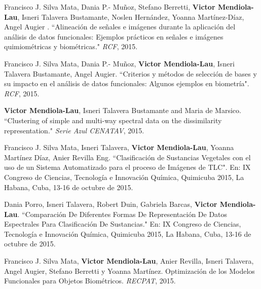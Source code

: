 \documentclass[]{friggeri-cv}
\begin{document}
\begin{paperlist}
  \paperentry
    {}
    {}
    {}
    {
		Francisco J. Silva Mata, Dania P.- Muñoz, Stefano Berretti, \textbf{Victor Mendiola-Lau}, Isneri Talavera Bustamante, Noslen Hernández, Yoanna Martínez-Díaz, Angel Augier . ``Alineación de señales e imágenes durante la aplicación del análisis de datos funcionales: Ejemplos prácticos en señales e imágenes quimiométricas y biométricas." \emph{RCF}, 2015.
    }
\end{paperlist}

\begin{paperlist}
  \paperentry
    {}
    {}
    {}
    {
		Francisco J. Silva Mata, Dania P.- Muñoz, \textbf{Victor Mendiola-Lau}, Isneri Talavera Bustamante, Angel Augier. ``Criterios y métodos de selección de bases y su impacto en el análisis de datos funcionales: Algunos ejemplos en biometría". \emph{RCF}, 2015.
    }
\end{paperlist}

\begin{paperlist}
  \paperentry
    {}
    {}
    {}
    {
		\textbf{Victor Mendiola-Lau}, Isneri Talavera Bustamante and Maria de Marsico. ``Clustering of simple and multi-way spectral data on the dissimilarity representation." \emph{Serie Azul CENATAV}, 2015.
    }
\end{paperlist}

\begin{paperlist}
  \paperentry
    {}
    {}
    {}
    {
		Francisco J. Silva Mata,  Isneri Talavera, \textbf{Victor Mendiola-Lau}, Yoanna Martínez Díaz, Anier Revilla Eng. ``Clasificación de Sustancias Vegetales con el uso de un Sistema Automatizado para el proceso de Imágenes de TLC". En: IX Congreso de Ciencias, Tecnología e Innovación Química, Quimicuba 2015, La Habana, Cuba, 13-16 de octubre de 2015.
    }
\end{paperlist}

\begin{paperlist}
  \paperentry
    {}
    {}
    {}
    {
		Dania Porro, Isneri Talavera, Robert Duin, Gabriela Barcas, \textbf{Victor Mendiola-Lau}. ``Comparación De Diferentes Formas De Representación De Datos Espectrales Para Clasificación De Sustancias." En: IX Congreso de Ciencias, Tecnología e Innovación Química, Quimicuba 2015, La Habana, Cuba, 13-16 de octubre de 2015.
    }
\end{paperlist}

\begin{paperlist}
  \paperentry
    {}
    {}
    {}
    {
		Francisco J. Silva Mata, \textbf{Victor Mendiola-Lau}, Anier Revilla, Isneri Talavera, Angel Augier, Stefano Berretti y Yoanna Martínez. Optimización de los Modelos Funcionales para Objetos Biométricos. \emph{RECPAT}, 2015.
    }
\end{paperlist}
\end{document}
